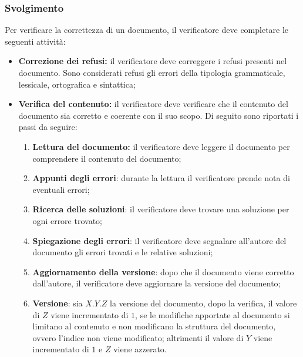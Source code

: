 \subsubsection{Svolgimento}

Per verificare la correttezza di un documento, il verificatore deve
completare le seguenti attività:
\begin{itemize}
	\item \textbf{Correzione dei refusi:} il verificatore deve correggere i
	      refusi presenti nel documento. Sono considerati refusi gli errori
	      della tipologia grammaticale, lessicale, ortografica e sintattica;

	\item \textbf{Verifica del contenuto:} il verificatore deve verificare
	      che il contenuto del documento sia corretto e coerente con il suo
	      scopo. Di seguito sono riportati i passi da seguire:
	      \begin{enumerate}
		      \item \textbf{Lettura del documento:} il verificatore deve
		            leggere il documento per comprendere il contenuto del
		            documento;

		      \item \textbf{Appunti degli errori}: durante la lettura il
		            verificatore prende nota di eventuali errori;

		      \item \textbf{Ricerca delle soluzioni}: il verificatore deve
		            trovare una soluzione per ogni errore trovato;

		      \item \textbf{Spiegazione degli errori}: il verificatore deve
		            segnalare all'autore del documento gli errori trovati e le
		            relative soluzioni;

		      \item \textbf{Aggiornamento della versione}: dopo che il documento
		            viene corretto dall'autore, il verificatore deve aggiornare
		            la versione del documento;

		      \item \textbf{Versione}: sia $X.Y.Z$ la versione del documento,
		            dopo la verifica, il valore di $Z$ viene incrementato di
		            $1$, se le modifiche apportate al documento si limitano al
		            contenuto e non modificano la struttura del documento,
		            ovvero l'indice non viene modificato; altrimenti il valore
		            di $Y$ viene incrementato di $1$ e $Z$ viene azzerato.
	      \end{enumerate}
\end{itemize}

